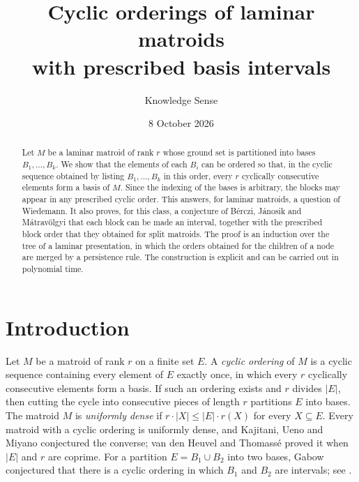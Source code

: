 \documentclass[11pt]{amsart}
\theoremstyle{definition}
\theoremstyle{remark}
\numberwithin{equation}{section}
\begin{document}
\title[Cyclic orderings of laminar matroids]{Cyclic orderings of laminar matroids\\ with prescribed basis intervals}
\author{Knowledge Sense}
\address{Knowledge Sense}
\date{8 October 2026}

\begin{abstract}
Let $M$ be a laminar matroid of rank $r$ whose ground set is partitioned into bases $B_1,\dots,B_k$. We show that the elements of each $B_i$ can be ordered so that, in the cyclic sequence obtained by listing $B_1,\dots,B_k$ in this order, every $r$ cyclically consecutive elements form a basis of $M$. Since the indexing of the bases is arbitrary, the blocks may appear in any prescribed cyclic order. This answers, for laminar matroids, a question of Wiedemann. It also proves, for this class, a conjecture of B\'erczi, J\'anosik and M\'atrav\"olgyi that each block can be made an interval, together with the prescribed block order that they obtained for split matroids. The proof is an induction over the tree of a laminar presentation, in which the orders obtained for the children of a node are merged by a persistence rule. The construction is explicit and can be carried out in polynomial time.
\end{abstract}

\maketitle

\section{Introduction}

Let $M$ be a matroid of rank $r$ on a finite set $E$. A \emph{cyclic ordering} of $M$ is a cyclic sequence containing every element of $E$ exactly once, in which every $r$ cyclically consecutive elements form a basis. If such an ordering exists and $r$ divides $|E|$, then cutting the cycle into consecutive pieces of length $r$ partitions $E$ into bases. The matroid $M$ is \emph{uniformly dense} if $r\cdot|X|\le|E|\cdot r(X)$ for every $X\subseteq E$. Every matroid with a cyclic ordering is uniformly dense, and Kajitani, Ueno and Miyano \cite{KUM} conjectured the converse; van den Heuvel and Thomass\'e \cite{HT} proved it when $|E|$ and $r$ are coprime. For a partition $E=B_1\cup B_2$ into two bases, Gabow \cite{Gabow} conjectured that there is a cyclic ordering in which $B_1$ and $B_2$ are intervals; see \cite[Conjecture~1]{BJM}.
\end{document}

